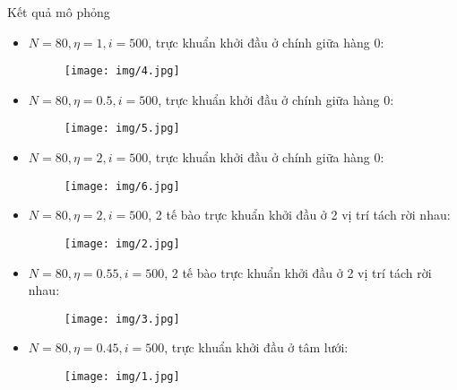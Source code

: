 \begin{frame}[allowframebreaks]{Kết quả mô phỏng}
\begin{itemize}
    \item $N = 80, \eta = 1, i = 500$, trực khuẩn khởi đầu ở chính giữa hàng 0:
    \begin{figure}[H]
        \centering
        \texttt{[image: img/4.jpg]}
    \end{figure}
\end{itemize}
\break
\begin{itemize}
    \item $N = 80, \eta = 0.5, i = 500$, trực khuẩn khởi đầu ở chính giữa hàng 0:
    \begin{figure}[H]
        \centering
        \texttt{[image: img/5.jpg]}
    \end{figure}
\end{itemize}
\break
\begin{itemize}
    \item $N = 80, \eta = 2, i = 500$, trực khuẩn khởi đầu ở chính giữa hàng 0:
    \begin{figure}[H]
        \centering
        \texttt{[image: img/6.jpg]}
    \end{figure}
\end{itemize}
\break
\begin{itemize}
    \item $N = 80, \eta = 2, i = 500$, 2 tế bào trực khuẩn khởi đầu ở 2 vị trí tách rời nhau:
    \begin{figure}[H]
        \centering
        \texttt{[image: img/2.jpg]}
    \end{figure}
\end{itemize}
\break
\begin{itemize}
    \item $N = 80, \eta = 0.55, i = 500$, 2 tế bào trực khuẩn khởi đầu ở 2 vị trí tách rời nhau:
    \begin{figure}[H]
        \centering
        \texttt{[image: img/3.jpg]}
    \end{figure}
\end{itemize}
\break
\begin{itemize}
    \item $N = 80, \eta = 0.45, i = 500$, trực khuẩn khởi đầu ở tâm lưới:
    \begin{figure}[H]
        \centering
        \texttt{[image: img/1.jpg]}
    \end{figure}
\end{itemize}
\end{frame}